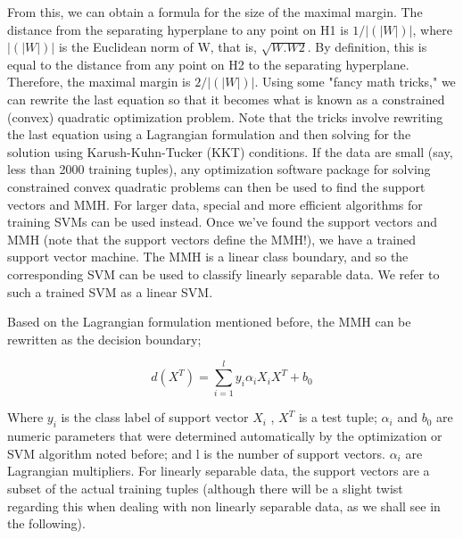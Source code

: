 From this, we can obtain a formula for the size of the maximal margin. The distance from the separating hyperplane to any point on H1 is $1/|(|W|)|$, where $|(|W|)|$ is the Euclidean norm of W, that is, $\sqrt{W . W2}$. By definition, this is equal to the distance from any point on H2 to the separating hyperplane. Therefore, the maximal margin is $2/|(|W|)|$. Using some "fancy math tricks," we can rewrite the last equation so that it becomes what is known as a constrained (convex) quadratic optimization problem. Note that the tricks involve rewriting the last equation using a Lagrangian formulation and then solving for the solution using Karush-Kuhn-Tucker (KKT) conditions. If the data are small (say, less than 2000 training tuples), any optimization software package for solving constrained convex quadratic problems can then be used to find the support vectors and MMH. For larger data, special and more efficient algorithms for training SVMs can be used instead. Once we've found the support vectors and MMH (note that the support vectors define the MMH!), we have a trained support vector machine. The MMH is a linear class boundary, and so the corresponding SVM can be used to classify linearly separable data. We refer to such a trained SVM as a linear SVM.\bigskip

Based on the Lagrangian formulation mentioned before, the MMH can be rewritten as the decision boundary;

\begin{dBox}
\begin{equation}
d(X^{T}) = \sum_{i=1}^{l}{y_i \alpha_i X_i X^T} + b_0
\end{equation}
\end{dBox}

Where $y_i$  is the class label of support vector $X_i$ , $X^T$ is a test tuple; $\alpha_i$ and $b_0$ are numeric parameters that were determined automatically by the optimization or SVM algorithm noted before; and l is the number of support vectors. $\alpha_i$ are Lagrangian multipliers. For linearly separable data, the support vectors are a subset of the actual training tuples (although there will be a slight twist regarding this when dealing with non linearly separable data, as we shall see in the following).\bigskip

